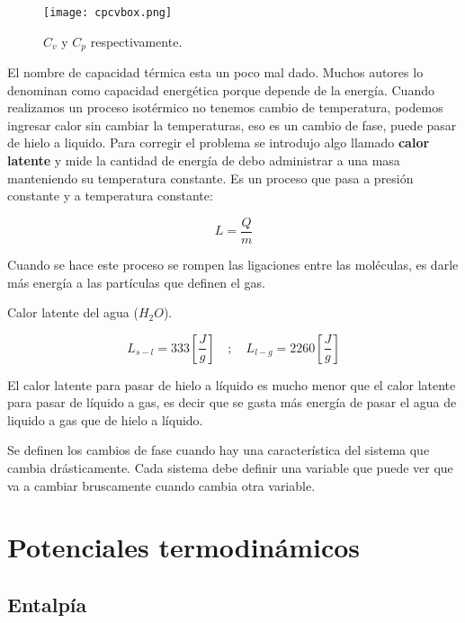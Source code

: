 \documentclass[11pt,fleqn]{book}
\begin{document}
\begin{figure}[H]
    \centering
    \texttt{[image: cpcvbox.png]}
    \caption{$C_{v}$ y $C_{p}$ respectivamente.}
    \end{figure}

El nombre de capacidad térmica esta un poco mal dado. Muchos autores lo denominan como capacidad energética porque depende de la energía. Cuando realizamos un proceso isotérmico no tenemos cambio de temperatura, podemos ingresar calor sin cambiar la temperaturas, eso es un cambio de fase, puede pasar de hielo a liquido. Para corregir el problema se introdujo algo llamado \textbf{calor latente} y mide la cantidad de energía de debo administrar a una masa manteniendo su temperatura constante. Es un proceso que pasa a presión constante  y a temperatura constante:

\begin{equation}
    L=\frac{Q}{m}
    \label{Eq. 1.25}
\end{equation}

Cuando se hace este proceso se rompen las ligaciones entre las moléculas, es darle más energía a las partículas que definen el gas.

\begin{example}
Calor latente del agua ($H_{2}O$).

\begin{equation*}
    L_{s-l}=333 \left[\frac{J}{g}\right]\quad;\quad L_{l-g}=2260 \left[\frac{J}{g}\right]
\end{equation*}

El calor latente para pasar de hielo a líquido es mucho menor que el calor latente para pasar de líquido a gas, es decir que se gasta más energía de pasar el agua de liquido a gas que de hielo a líquido. 
\end{example}

Se definen los cambios de fase cuando hay una característica del sistema que cambia drásticamente. Cada sistema debe definir una variable que puede ver que va a cambiar bruscamente cuando cambia otra variable. 

\section{Potenciales termodinámicos}
\subsection{Entalpía}
\end{document}
